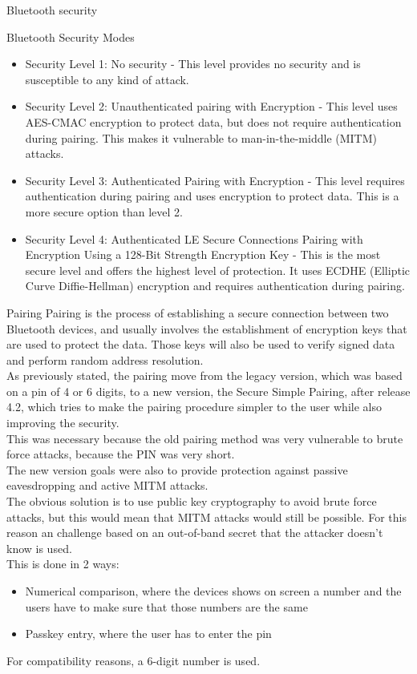 \begin{section}{Bluetooth security}
\begin{subsection}{Bluetooth Security Modes}
    \begin{itemize}
      \item Security Level 1: No security  - This level provides no security and is susceptible to
        any kind of attack.
      \item Security Level 2: Unauthenticated pairing with Encryption - This level uses AES-CMAC
        encryption to protect data, but does not require authentication during pairing. This makes
        it vulnerable to man-in-the-middle (MITM) attacks.
      \item Security Level 3: Authenticated Pairing with Encryption - This level requires
        authentication during pairing and uses encryption to protect data. This is a more secure
        option than level 2.
      \item Security Level 4: Authenticated LE Secure Connections Pairing with Encryption Using a
        128-Bit Strength Encryption Key - This is the most secure level and offers the highest level
        of protection. It uses ECDHE (Elliptic Curve Diffie-Hellman) encryption and requires
        authentication during pairing.
    \end{itemize}

  \end{subsection}
  
  \begin{subsection}{Pairing}
    Pairing is the process of establishing a secure connection between two Bluetooth devices, and
    usually involves the establishment of encryption keys that are used to protect the data.
    Those keys will also be used to verify signed data and perform random address resolution.\\

    As previously stated, the pairing move from the legacy version, which was based on a pin of 4 or 
    6 digits, to a new version, the Secure Simple Pairing, after release 4.2, which tries to make
    the pairing procedure simpler to the user while also improving the security.\\
    This was necessary because the old pairing method was very vulnerable to brute force attacks,
    because the PIN was very short.\\
    The new version goals were also to provide protection against passive eavesdropping and active
    MITM attacks.\\
    The obvious solution is to use public key cryptography to avoid brute force attacks, but this
    would mean that MITM attacks would still be possible. For this reason an challenge based on an
    out-of-band secret that the attacker doesn't know is used.\\
    This is done in 2 ways:
    \begin{itemize}
      \item Numerical comparison, where the devices shows on screen a number and the users have to
        make sure that those numbers are the same
      \item Passkey entry, where the user has to enter the pin
    \end{itemize}
    For compatibility reasons, a 6-digit number is used.


\end{subsection}
\end{section}
